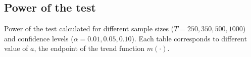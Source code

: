 \subsection{Power of the test}\label{subsec-sim-power}
\begin{center}
Power of the test calculated for different sample sizes ($T = 250, 350, 500, 1000$) and confidence levels ($\alpha = 0.01, 0.05, 0.10$). Each table corresponds to different value of $a$, the endpoint of the trend function $m(\cdot)$.\\
\begin{minipage}{.45\textwidth}
\begin{table}[H]
    \begin{center}
        \caption{$a = 0.25$}
        \label{tab:power_025_ll}
        \centering
        
    \end{center}
\end{table}

\end{minipage}
\begin{minipage}{.45\textwidth}

\begin{table}[H]
    \begin{center}
        \caption{$a = 0.50$}
        \label{tab:power_050_ll}
        \centering
        
    \end{center}
\end{table}
\end{minipage}


\begin{minipage}{.45\textwidth}
\begin{table}[H]
    \begin{center}
        \caption{$a = 0.65$}
        \label{tab:power_065_ll}
        \centering
        
    \end{center}
\end{table}
\end{minipage}
\begin{minipage}{.45\textwidth}
\begin{table}[H]
    \begin{center}
        \caption{$a = 0.75$}
        \label{tab:power_075_ll}
        \centering
        
    \end{center}
\end{table}
\end{minipage}

\end{center}


